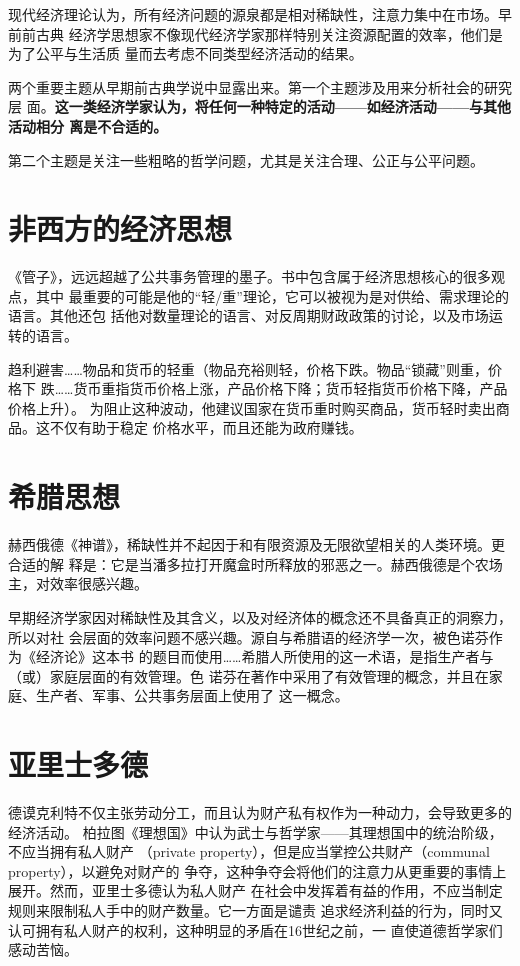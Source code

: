 现代经济理论认为，所有经济问题的源泉都是相对稀缺性，注意力集中在市场。早前前古典
经济学思想家不像现代经济学家那样特别关注资源配置的效率，他们是为了公平与生活质
量而去考虑不同类型经济活动的结果。

两个重要主题从早期前古典学说中显露出来。第一个主题涉及用来分析社会的研究层
面。\textbf{这一类经济学家认为，将任何一种特定的活动——如经济活动——与其他活动相分
  离是不合适的。}

第二个主题是关注一些粗略的哲学问题，尤其是关注合理、公正与公平问题。

\section{非西方的经济思想}

《管子》，远远超越了公共事务管理的墨子。书中包含属于经济思想核心的很多观点，其中
最重要的可能是他的“轻/重”理论，它可以被视为是对供给、需求理论的语言。其他还包
括他对数量理论的语言、对反周期财政政策的讨论，以及市场运转的语言。

趋利避害……物品和货币的轻重（物品充裕则轻，价格下跌。物品“锁藏”则重，价格下
跌……货币重指货币价格上涨，产品价格下降；货币轻指货币价格下降，产品价格上升）。
为阻止这种波动，他建议国家在货币重时购买商品，货币轻时卖出商品。这不仅有助于稳定
价格水平，而且还能为政府赚钱。

\section{希腊思想}

赫西俄德《神谱》，稀缺性并不起因于和有限资源及无限欲望相关的人类环境。更合适的解
释是：它是当潘多拉打开魔盒时所释放的邪恶之一。赫西俄德是个农场主，对效率很感兴趣。

早期经济学家因对稀缺性及其含义，以及对经济体的概念还不具备真正的洞察力，所以对社
会层面的效率问题不感兴趣。源自与希腊语的经济学一次，被色诺芬作为《经济论》这本书
的题目而使用……希腊人所使用的这一术语，是指生产者与（或）家庭层面的有效管理。色
诺芬在著作中采用了有效管理的概念，并且在家庭、生产者、军事、公共事务层面上使用了
这一概念。

\section{亚里士多德}

德谟克利特不仅主张劳动分工，而且认为财产私有权作为一种动力，会导致更多的经济活动。
柏拉图《理想国》中认为武士与哲学家——其理想国中的统治阶级，不应当拥有私人财产
（private property），但是应当掌控公共财产（communal property），以避免对财产的
争夺，这种争夺会将他们的注意力从更重要的事情上展开。然而，亚里士多德认为私人财产
在社会中发挥着有益的作用，不应当制定规则来限制私人手中的财产数量。它一方面是谴责
追求经济利益的行为，同时又认可拥有私人财产的权利，这种明显的矛盾在16世纪之前，一
直使道德哲学家们感动苦恼。

